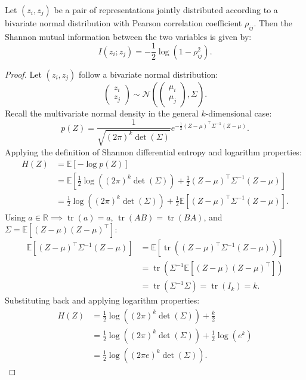 \documentclass[11pt, oneside, openany]{book}
\DeclareMathOperator{\tr}{tr}
\begin{document}
\begin{proposition}
\label{prop:5.1}
Let $(z_{i}, z_{j})$ be a pair of representations jointly distributed according to a bivariate normal distribution with Pearson correlation coefficient $\rho_{ij}$. Then the Shannon mutual information between the two variables is given by:
\begin{equation}
\label{eq:5.3}
I(z_{i}; z_{j}) = -\frac{1}{2} \log\left(1 - \rho_{ij}^{2}\right).
\end{equation}
\end{proposition}

\begin{proof}
Let $(z_{i}, z_{j})$ follow a bivariate normal distribution:
\begin{equation}
\label{eq:5.4}
\begin{pmatrix} z_{i} \\ z_{j} \end{pmatrix} \sim \mathcal{N}\left( \begin{pmatrix} \mu_{i} \\ \mu_{j} \end{pmatrix}, \Sigma \right).
\end{equation}
Recall the multivariate normal density in the general $k$-dimensional case:
\begin{equation}
\label{eq:5.5}
p(Z) = \frac{1}{\sqrt{(2\pi)^{k} \det(\Sigma)}} e^{-\frac{1}{2}(Z - \mu)^{\top} \Sigma^{-1} (Z - \mu)}.
\end{equation}
Applying the definition of Shannon differential entropy and logarithm properties:
\begin{align}
H(Z) &= \mathbb{E}[-\log p(Z)] \nonumber \\
&= \mathbb{E}\left[ \frac{1}{2}\log\left((2\pi)^{k} \det(\Sigma)\right) + \frac{1}{2}(Z - \mu)^{\top} \Sigma^{-1} (Z - \mu) \right] \label{eq:5.6} \\
&= \frac{1}{2}\log\left((2\pi)^{k} \det(\Sigma)\right) + \frac{1}{2}\mathbb{E}\left[ (Z - \mu)^{\top} \Sigma^{-1} (Z - \mu) \right]. \nonumber
\end{align}
Using $a \in \mathbb{R} \implies \tr(a) = a$, $\tr(AB) = \tr(BA)$, and $\Sigma = \mathbb{E}[(Z - \mu)(Z - \mu)^{\top}]$:
\begin{align}
\mathbb{E}\left[ (Z - \mu)^{\top} \Sigma^{-1} (Z - \mu) \right] &= \mathbb{E}\left[ \tr\left( (Z - \mu)^{\top} \Sigma^{-1} (Z - \mu) \right) \right] \nonumber \\
&= \tr\left( \Sigma^{-1} \mathbb{E}\left[ (Z - \mu)(Z - \mu)^{\top} \right] \right) \label{eq:5.7} \\
&= \tr(\Sigma^{-1} \Sigma) = \tr(I_{k}) = k. \nonumber
\end{align}
Substituting back and applying logarithm properties:
\begin{align}
H(Z) &= \frac{1}{2}\log\left((2\pi)^{k} \det(\Sigma)\right) + \frac{k}{2} \nonumber \\
&= \frac{1}{2}\log\left((2\pi)^{k} \det(\Sigma)\right) + \frac{1}{2}\log(e^{k}) \label{eq:5.8} \\
&= \frac{1}{2}\log\left((2\pi e)^{k} \det(\Sigma)\right). \nonumber
\end{align}


\end{proof}
\end{document}
